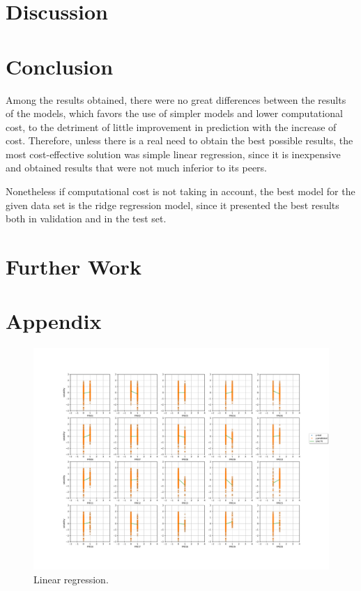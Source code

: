 \section{Discussion}


\section{Conclusion}
Among the results obtained, there were no great differences between the results of the models, which favors the use of simpler models and lower computational cost, to the detriment of little improvement in prediction with the increase of cost. Therefore, unless there is a real need to obtain the best possible results, the most cost-effective solution was simple linear regression, since it is inexpensive and obtained results that were not much inferior to its peers. 

Nonetheless if computational cost is not taking in account, the best model for the given data set is the ridge regression model, since it presented the best results both in validation and in the test set.



\section{Further Work}


\section*{Appendix}

\begin{figure}[htbp!]
  \centerline{\includegraphics[width=1\textwidth]{../../code/hw2/figures/2-linear-regression.pdf}}
  \caption{Linear regression.}
  \label{fig:2-linear-regression}
\end{figure}

